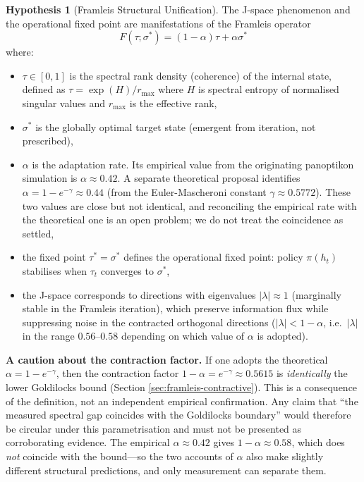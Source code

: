 \documentclass[11pt,a4paper]{article}
\theoremstyle{definition}
\newtheorem{hypothesis}{Hypothesis}
\begin{document}
\begin{hypothesis}[Framleis Structural Unification]
The J-space phenomenon and the operational fixed point are manifestations of
the Framleis operator
\begin{equation}
    F(\tau; \sigma^*) = (1-\alpha)\tau + \alpha\sigma^*
\end{equation}
where:
\begin{itemize}
    \item $\tau \in [0,1]$ is the spectral rank density (coherence) of the internal
    state, defined as $\tau = \exp(H) / r_{\max}$ where $H$ is spectral entropy
    of normalised singular values and $r_{\max}$ is the effective rank,
    \item $\sigma^*$ is the globally optimal target state (emergent from iteration,
    not prescribed),
    \item $\alpha$ is the adaptation rate. Its empirical value from the originating
    panoptikon simulation is $\alpha \approx 0.42$. A separate theoretical proposal
    identifies $\alpha = 1 - e^{-\gamma} \approx 0.44$ (from the Euler-Mascheroni
    constant $\gamma \approx 0.5772$). These two values are close but not identical,
    and reconciling the empirical rate with the theoretical one is an open problem;
    we do not treat the coincidence as settled,
    \item the fixed point $\tau^* = \sigma^*$ defines the operational fixed point:
    policy $\pi(h_t)$ stabilises when $\tau_t$ converges to $\sigma^*$,
    \item the J-space corresponds to directions with eigenvalues $|\lambda| \approx 1$
    (marginally stable in the Framleis iteration), which preserve information flux
    while suppressing noise in the contracted orthogonal directions
    ($|\lambda| < 1-\alpha$, i.e.\ $|\lambda|$ in the range $0.56$--$0.58$ depending
    on which value of $\alpha$ is adopted).
\end{itemize}
\end{hypothesis}

\noindent
\textbf{A caution about the contraction factor.} If one adopts the theoretical
$\alpha = 1 - e^{-\gamma}$, then the contraction factor $1-\alpha = e^{-\gamma}
\approx 0.5615$ is \emph{identically} the lower Goldilocks bound (Section
\ref{sec:framleis-contractive}). This is a consequence of the definition, not an
independent empirical confirmation. Any claim that ``the measured spectral gap
coincides with the Goldilocks boundary'' would therefore be circular under this
parametrisation and must not be presented as corroborating evidence. The
empirical $\alpha \approx 0.42$ gives $1-\alpha \approx 0.58$, which does
\emph{not} coincide with the bound---so the two accounts of $\alpha$ also make
slightly different structural predictions, and only measurement can separate them.
\end{document}
